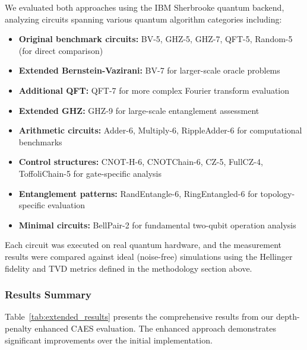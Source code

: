 \documentclass[conference]{IEEEtran}
\begin{document}
We evaluated both approaches using the IBM Sherbrooke quantum backend, analyzing circuits spanning various quantum algorithm categories including:
\begin{itemize}
    \item \textbf{Original benchmark circuits:} BV-5, GHZ-5, GHZ-7, QFT-5, Random-5 (for direct comparison)
    \item \textbf{Extended Bernstein-Vazirani:} BV-7 for larger-scale oracle problems
    \item \textbf{Additional QFT:} QFT-7 for more complex Fourier transform evaluation
    \item \textbf{Extended GHZ:} GHZ-9 for large-scale entanglement assessment
    \item \textbf{Arithmetic circuits:} Adder-6, Multiply-6, RippleAdder-6 for computational benchmarks
    \item \textbf{Control structures:} CNOT-H-6, CNOTChain-6, CZ-5, FullCZ-4, ToffoliChain-5 for gate-specific analysis
    \item \textbf{Entanglement patterns:} RandEntangle-6, RingEntangled-6 for topology-specific evaluation
    \item \textbf{Minimal circuits:} BellPair-2 for fundamental two-qubit operation analysis
\end{itemize}

Each circuit was executed on real quantum hardware, and the measurement results were compared against ideal (noise-free) simulations using the Hellinger fidelity and TVD metrics defined in the methodology section above.

\subsubsection{Results Summary}

Table~\ref{tab:extended_results} presents the comprehensive results from our depth-penalty enhanced CAES evaluation. The enhanced approach demonstrates significant improvements over the initial implementation.
\end{document}
